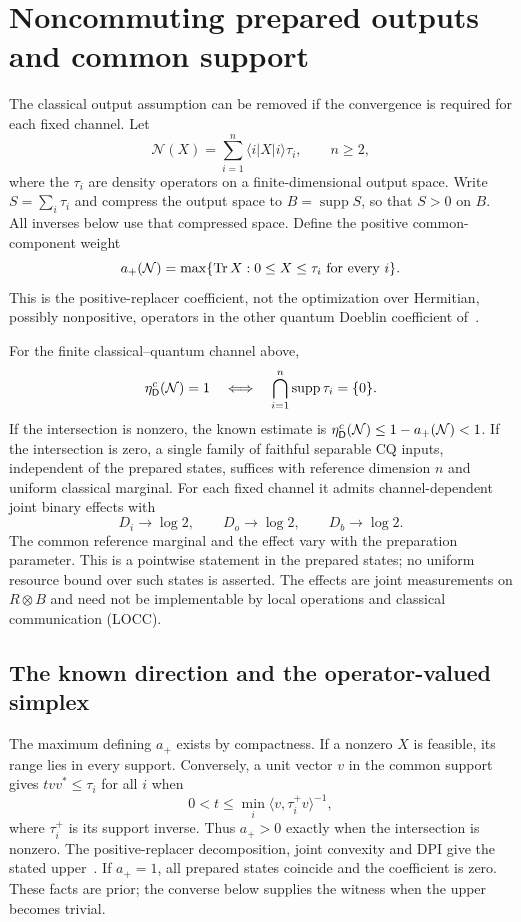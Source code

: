 \section{Noncommuting prepared outputs and common support}\label{sec:cq}
The classical output assumption can be removed if the convergence is required for each fixed channel. Let
\[
 \mathcal N(X)=\sum_{i=1}^{n}\langle i|X|i\rangle\tau_i,
 \qquad n\geq2,
\]
where the $\tau_i$ are density operators on a finite-dimensional output space. Write $S=\sum_i\tau_i$ and compress the output space to $B=\operatorname{supp}S$, so that $S>0$ on $B$. All inverses below use that compressed space. Define the positive common-component weight
\[
 a_+(\mathcal N)=\max\{\operatorname{Tr} X:0\leq X\leq\tau_i\text{ for every }i\}.
\]
This is the positive-replacer coefficient, not the optimization over Hermitian, possibly nonpositive, operators in the other quantum Doeblin coefficient of~\cite{GHNW}.

\begin{theorem}\label{thm:cq-support}
For the finite classical--quantum channel above,
\[
 \eta_{\mathsf D}^{c}(\mathcal N)=1
 \quad\Longleftrightarrow\quad
 \bigcap_{i=1}^{n}\operatorname{supp}\tau_i=\{0\}.
\]
If the intersection is nonzero, the known estimate is $\eta_{\mathsf D}^{c}(\mathcal N)\leq1-a_+(\mathcal N)<1$. If the intersection is zero, a single family of faithful separable CQ inputs, independent of the prepared states, suffices with reference dimension $n$ and uniform classical marginal. For each fixed channel it admits channel-dependent joint binary effects with
\[
 D_i\longrightarrow\log2,\qquad
 D_o\longrightarrow\log2,\qquad
 D_b\longrightarrow\log2.
\]
The common reference marginal and the effect vary with the preparation parameter. This is a pointwise statement in the prepared states; no uniform resource bound over such states is asserted. The effects are joint measurements on $R\otimes B$ and need not be implementable by local operations and classical communication (LOCC).
\end{theorem}

\subsection{The known direction and the operator-valued simplex}
The maximum defining $a_+$ exists by compactness. If a nonzero $X$ is feasible, its range lies in every support. Conversely, a unit vector $v$ in the common support gives $t vv^*\leq\tau_i$ for all $i$ when
\[
 0<t\leq\min_i\langle v,\tau_i^+v\rangle^{-1},
\]
where $\tau_i^+$ is its support inverse. Thus $a_+>0$ exactly when the intersection is nonzero. The positive-replacer decomposition, joint convexity and DPI give the stated upper~\cite{GHNW,HGNW}. If $a_+=1$, all prepared states coincide and the coefficient is zero. These facts are prior; the converse below supplies the witness when the upper becomes trivial.

